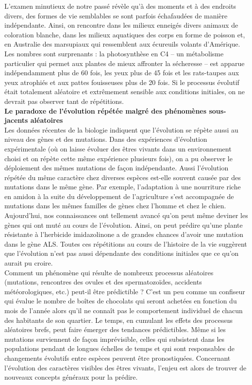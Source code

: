 \documentclass[8pt]{article}
\begin{document}
L’examen minutieux de notre passé révèle qu’à des moments et à des endroits divers, des formes de vie semblables se sont parfois échafaudées de manière indépendante. Ainsi, on rencontre dans les milieux enneigés divers animaux de coloration blanche, dans les milieux aquatiques des corps en forme de poisson et, en Australie des marsupiaux qui ressemblent aux écureuils volants d’Amérique. Les nombres sont surprenants : la photosynthèse en C4 – un métabolisme particulier qui permet aux plantes de mieux affronter la sécheresse – est apparue indépendamment plus de 60 fois, les yeux plus de 45 fois et les rats-taupes aux yeux atrophiés et aux pattes fouisseuses plus de 20 fois. Si le processus évolutif était totalement aléatoire et extrêmement sensible aux conditions initiales, on ne devrait pas observer tant de répétitions.\\

\textbf{Le paradoxe de l’évolution répétée malgré des phénomènes sous-jacents aléatoires}\\

Les données récentes de la biologie indiquent que l’évolution se répète aussi au niveau des gènes et des mutations. Dans des expériences d’évolution expérimentale (où on laisse évoluer des êtres vivants dans un environnement choisi et on répète cette même expérience plusieurs fois), on a pu observer le déploiement des mêmes mutations de façon indépendante. Aussi l’évolution répétée du même caractère chez diverses espèces est-elle souvent causée par des mutations dans le même gène. Par exemple, l’adaptation à une nourriture riche en amidon à la suite du développement de l’agriculture s’est accompagnée de mutations dans les mêmes familles de gènes chez l’homme et chez le chien.\\

Aujourd’hui, nos connaissances ont tellement avancé qu’on peut même deviner les gènes qui ont muté au cours de l’évolution. Ainsi, on peut prédire qu’une plante résistante à l’herbicide imidazolinone a de grandes chances d’avoir une mutation dans le gène ALS. Toutes ces répétitions au cours de l’histoire de la vie suggèrent que l’évolution n’est pas aussi dépendante des conditions initiales que ce qu’on aurait pu croire.\\

Comment un phénomène qui résulte de nombreux processus aléatoires (mutations, rencontres des ovules et des spermatozoïdes, accidents météorologiques, etc.) peut-il être prédictible ? C’est un peu comme un confiseur qui évalue le nombre de boîtes de chocolats qui seront achetées en fonction du mois de l’année alors qu’il ne connaît pas le comportement individuel de chacun des habitants de son quartier. Le temps, en cumulant les effets des processus aléatoires brefs, peut faire émerger des tendances prédictibles. Même si les mutations surviennent de façon imprévisible, celles qui subsistent dans les populations pendant de longues échelles de temps et qui sont responsables de changements évolutifs entre espèces peuvent être pronostiquées. Concernant l’évolution des caractères visibles des êtres vivants, l’enjeu est alors de trouver de nouveaux concepts généraux pour la prédire.\\
\end{document}
